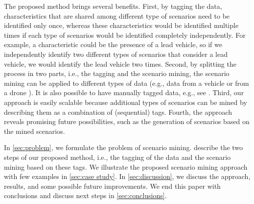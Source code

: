\cstarta The proposed method brings several benefits. 
First, by tagging the data, characteristics that are shared among different type of scenarios need to be identified only once, whereas these characteristics would be identified multiple times if each type of scenarios would be identified completely independently. \cenda
\cstartf For example, a characteristic could be the presence of a lead vehicle, so if we independently identify two different types of scenarios that consider a lead vehicle, we would identify the lead vehicle two times. \cendf
\cstarta Second, by splitting the process in two parts, i.e., the tagging and the scenario mining, the scenario mining can be applied to different types of data (e.g., data from a vehicle \autocite{paardekooper2019dataset6000km} or from a drone \autocite{krajewski2018highD}). 
It is also possible to have manually tagged data, e.g., see \autocite{fontana2018action}. 
Third, our approach is easily scalable because additional types of scenarios can be mined by  describing them as a combination of (sequential) tags. \cenda
\cstartf Fourth, the approach reveals promising future possibilities, such as the generation of scenarios based on the mined scenarios. \cendf

\cstarta In \cref{sec:problem}, we formulate the problem of scenario mining.  describe the two steps of our proposed method, i.e., the tagging of the data and the scenario mining based on these tags. 
We illustrate the proposed scenario mining approach with few examples in \cref{sec:case study}. \cenda
\cstartf In \cref{sec:discussion}, we discuss the approach, results, and some possible future improvements. \cendf
We end this paper with conclusions and discuss next steps in \cref{sec:conclusions}. \cenda
